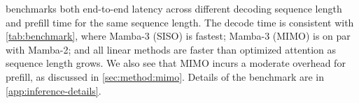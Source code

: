  benchmarks both end-to-end latency across different decoding sequence length and prefill time for the same sequence length.
The decode time is consistent with \cref{tab:benchmark}, where Mamba-3 (SISO) is fastest; Mamba-3 (MIMO) is on par with Mamba-2; and all linear methods are faster than optimized attention as sequence length grows.
We also see that MIMO incurs a moderate overhead for prefill, as discussed in \cref{sec:method:mimo}.
Details of the benchmark are in \cref{app:inference-details}.
